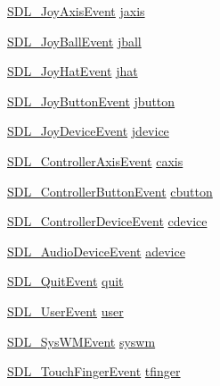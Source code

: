 \begin{DoxyCompactItemize}
\item 
\hyperlink{struct_s_d_l___joy_axis_event}{S\-D\-L\-\_\-\-Joy\-Axis\-Event} \hyperlink{union_s_d_l___event_ac4611acd0e9c675e67dc20919f0accb4}{jaxis}
\item 
\hyperlink{struct_s_d_l___joy_ball_event}{S\-D\-L\-\_\-\-Joy\-Ball\-Event} \hyperlink{union_s_d_l___event_ae433f511e3383d17f8fe02df745ee8f8}{jball}
\item 
\hyperlink{struct_s_d_l___joy_hat_event}{S\-D\-L\-\_\-\-Joy\-Hat\-Event} \hyperlink{union_s_d_l___event_a421b40e0f8e01f181c8d5548cff1dd1d}{jhat}
\item 
\hyperlink{struct_s_d_l___joy_button_event}{S\-D\-L\-\_\-\-Joy\-Button\-Event} \hyperlink{union_s_d_l___event_a591104d64903ae1cf70874fb5d3124ff}{jbutton}
\item 
\hyperlink{struct_s_d_l___joy_device_event}{S\-D\-L\-\_\-\-Joy\-Device\-Event} \hyperlink{union_s_d_l___event_a17514dc19a846ea1b5fbe44123700c4c}{jdevice}
\item 
\hyperlink{struct_s_d_l___controller_axis_event}{S\-D\-L\-\_\-\-Controller\-Axis\-Event} \hyperlink{union_s_d_l___event_aa8f6df0f2716fae56204b12ab4a4c289}{caxis}
\item 
\hyperlink{struct_s_d_l___controller_button_event}{S\-D\-L\-\_\-\-Controller\-Button\-Event} \hyperlink{union_s_d_l___event_aee2b5671c8dcdb447023715cc21593cb}{cbutton}
\item 
\hyperlink{struct_s_d_l___controller_device_event}{S\-D\-L\-\_\-\-Controller\-Device\-Event} \hyperlink{union_s_d_l___event_ad3beed01e690b885728e0b0e1d636378}{cdevice}
\item 
\hyperlink{struct_s_d_l___audio_device_event}{S\-D\-L\-\_\-\-Audio\-Device\-Event} \hyperlink{union_s_d_l___event_a111e01fcac4fd8e251a6058ff9f17e72}{adevice}
\item 
\hyperlink{struct_s_d_l___quit_event}{S\-D\-L\-\_\-\-Quit\-Event} \hyperlink{union_s_d_l___event_a102a3008afe67a1c02ae7504e232dcef}{quit}
\item 
\hyperlink{struct_s_d_l___user_event}{S\-D\-L\-\_\-\-User\-Event} \hyperlink{union_s_d_l___event_ab7c394e3ce7bf1e4f8d68bc0e9f1b042}{user}
\item 
\hyperlink{struct_s_d_l___sys_w_m_event}{S\-D\-L\-\_\-\-Sys\-W\-M\-Event} \hyperlink{union_s_d_l___event_ab3b2eaf5348d4c50a51b1f297fdef537}{syswm}
\item 
\hyperlink{struct_s_d_l___touch_finger_event}{S\-D\-L\-\_\-\-Touch\-Finger\-Event} \hyperlink{union_s_d_l___event_ab18d7d60794cb056948ffa58541bc3c5}{tfinger}
\item 

\end{DoxyCompactItemize}

